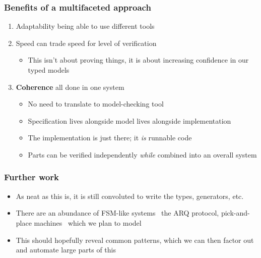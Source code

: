 \documentclass[compress,handout]{beamer}
\begin{document}
\begin{frame}
  \frametitle{Benefits of a multifaceted approach}

  \begin{enumerate}
    \item<1-> Adaptability {\textemdash} being able to use different tools
    \item<2-> Speed {\textemdash} can trade speed for level of verification
    \begin{itemize}
      \item<2-> This isn't about proving things, it is about increasing
                confidence in our typed models
    \end{itemize}
    \item<3-> \textbf{Coherence} {\textemdash} all done in one system
      \begin{itemize}
        \item<4-> No need to translate to model-checking tool
        \item<5-> Specification lives alongside model lives alongside
                  implementation
        \item<6-> The implementation is just there; it \emph{is} runnable code
        \item<7-> Parts can be verified independently \emph{while} combined into an
                  overall system
      \end{itemize}
  \end{enumerate}

\end{frame}




\begin{frame}
  \frametitle{Further work}

  \begin{itemize}
    \item<1-> As neat as this is, it is still convoluted to write the types,
              generators, etc.
    \item<2-> There are an abundance of FSM-like systems \textemdash\ the ARQ
              protocol, pick-and-place machines \textemdash\ which we plan to
              model
    \item<3-> This should hopefully reveal common patterns, which we can then
              factor out and automate large parts of this
  \end{itemize}

\end{frame}
\end{document}
